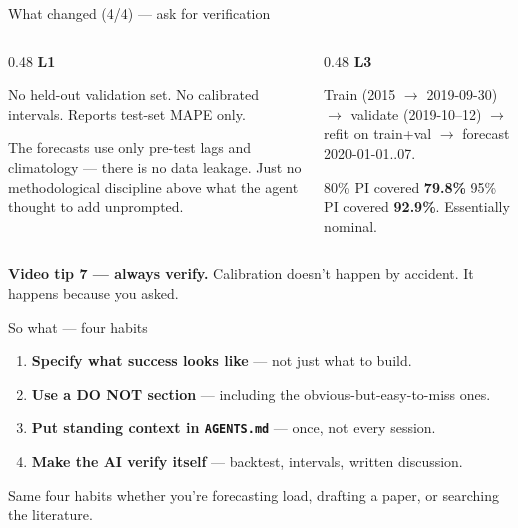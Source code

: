 \documentclass[aspectratio=169,11pt]{beamer}
\begin{document}
\begin{frame}{What changed (4/4) --- ask for verification}
  \begin{columns}[t,onlytextwidth]
    \begin{column}{0.48\textwidth}
      \textbf{\textcolor{l1grey}{L1}}\par\vspace{4pt}
      \small No held-out validation set. No calibrated intervals. Reports test-set MAPE only.\par\vspace{6pt}
      The forecasts use only pre-test lags and climatology --- there is no data leakage. Just no methodological discipline above what the agent thought to add unprompted.
    \end{column}
    \begin{column}{0.48\textwidth}
      \textbf{\textcolor{l3orange}{L3}}\par\vspace{4pt}
      \small Train (2015 $\to$ 2019-09-30) $\to$ validate (2019-10--12) $\to$ refit on train+val $\to$ forecast 2020-01-01..07.\par\vspace{6pt}
      80\% PI covered \textbf{79.8\%} \textperiodcentered{} 95\% PI covered \textbf{92.9\%}. Essentially nominal.
    \end{column}
  \end{columns}
  \vspace{6pt}
  \begin{center}\small\color{gray!40!black}
    \textbf{Video tip 7 --- always verify.} Calibration doesn't happen by accident.
    It happens because you asked.
  \end{center}
\end{frame}

\begin{frame}{So what --- four habits}
  \vspace{8pt}
  \begin{enumerate}\large
    \item \textbf{Specify what success looks like} --- not just what to build.
    \item \textbf{Use a DO NOT section} --- including the obvious-but-easy-to-miss ones.
    \item \textbf{Put standing context in \texttt{AGENTS.md}} --- once, not every session.
    \item \textbf{Make the AI verify itself} --- backtest, intervals, written discussion.
  \end{enumerate}
  \vspace{10pt}
  \begin{center}\small\color{gray!40!black}
    Same four habits whether you're forecasting load, drafting a paper, or searching the literature.
  \end{center}
\end{frame}
\end{document}
